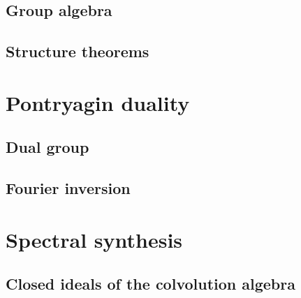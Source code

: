 \documentclass{../../large}
\begin{document}
\begin{prb}
\end{prb}

\section{Group algebra}
\begin{prb}
\end{prb}
\begin{prb}[Convolution]
\end{prb}

\section{Structure theorems}


\chapter{Pontryagin duality}
\section{Dual group}
\section{}
\section{Fourier inversion}
\begin{prb}
\end{prb}
\begin{prb}
\end{prb}
\begin{prb}
\end{prb}
\begin{prb}
\end{prb}


\chapter{Spectral synthesis}
\section{Closed ideals of the colvolution algebra}
\end{document}

